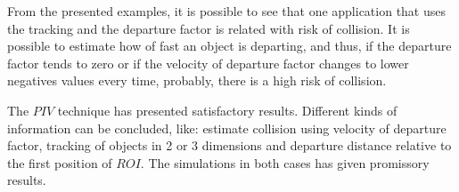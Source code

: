 From the presented examples,
it is possible to see that one application that uses the tracking
and the departure factor is related with risk of collision.
It is possible to estimate how of fast an object is departing,
and thus, if the  departure factor tends to zero or 
if the velocity of departure factor changes to lower negatives values every time, 
probably, there is a high risk of collision.

The $PIV$ technique has presented satisfactory results. 
Different kinds of information can be concluded, 
like: estimate collision using velocity of departure factor, 
tracking of objects in 2 or 3 dimensions and departure distance
relative to the first position of $ROI$. 
The simulations in both cases has given promissory results.
